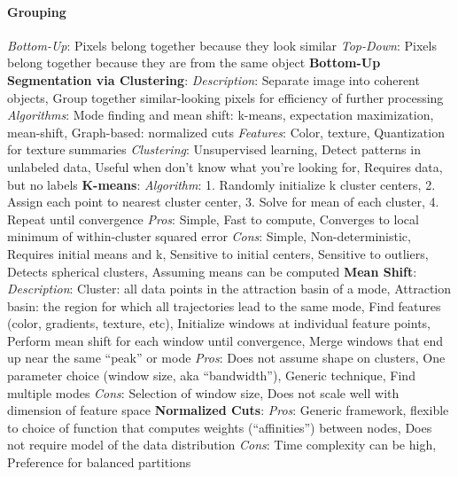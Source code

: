 \documentclass{article}
\begin{document}
\begin{multicols*}{2}
        \paragraph*{Grouping}
        \textit{Bottom-Up}: Pixels belong together because they look similar\newline
        \textit{Top-Down}: Pixels belong together because they are from the same object\newline
        \textbf{Bottom-Up Segmentation via Clustering}:\newline
        \textit{Description}: Separate image into coherent objects, Group together similar-looking pixels for
        efficiency of further processing\newline
        \textit{Algorithms}: Mode finding and mean shift: k-means, expectation maximization, mean-shift, Graph-based:
        normalized cuts\newline
        \textit{Features}: Color, texture, Quantization for texture summaries\newline
        \textit{Clustering}: Unsupervised learning, Detect patterns in unlabeled data, Useful when don’t know what
        you’re looking for, Requires data, but no labels\newline
        \textbf{K-means}:\newline
        \textit{Algorithm}: 1. Randomly initialize k cluster centers, 2. Assign each point to nearest cluster center,
        3. Solve for mean of each cluster, 4. Repeat until convergence\newline
        \textit{Pros}: Simple, Fast to compute, Converges to local minimum of within-cluster squared error
        \textit{Cons}: Simple, Non-deterministic, Requires initial means and k, Sensitive to initial centers, Sensitive
        to outliers, Detects spherical clusters, Assuming means can be computed\newline
        \textbf{Mean Shift}:\newline
        \textit{Description}: Cluster: all data points in the attraction basin of a mode, Attraction basin: the
        region for which all trajectories lead to the same mode, Find features (color, gradients, texture, etc),
        Initialize windows at individual feature points, Perform mean shift for each window until convergence, Merge
        windows that end up near the same “peak” or mode\newline
        \textit{Pros}: Does not assume shape on clusters, One parameter choice (window size, aka “bandwidth”), Generic
        technique, Find multiple modes\newline
        \textit{Cons}: Selection of window size, Does not scale well with dimension of feature space\newline
        \textbf{Normalized Cuts}:\newline
        \textit{Pros}: Generic framework, flexible to choice of function that computes weights (“affinities”) between
        nodes, Does not require model of the data distribution\newline
        \textit{Cons}: Time complexity can be high, Preference for balanced partitions

\end{multicols*}
\end{document}
